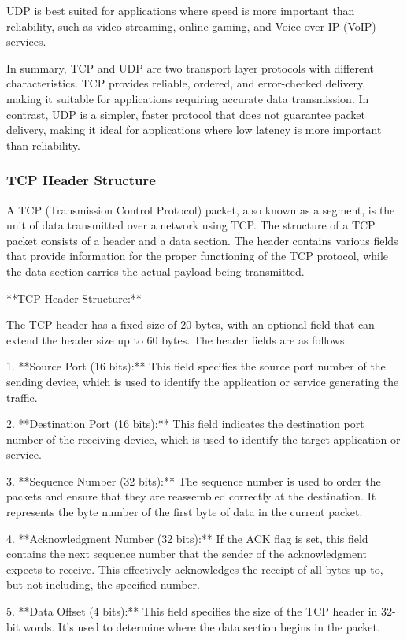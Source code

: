 \documentclass{article}
\begin{document}
UDP is best suited for applications where speed is more important than reliability, such as video streaming, online gaming, and Voice over IP (VoIP) services.

In summary, TCP and UDP are two transport layer protocols with different characteristics. TCP provides reliable, ordered, and error-checked delivery, making it suitable for applications requiring accurate data transmission. In contrast, UDP is a simpler, faster protocol that does not guarantee packet delivery, making it ideal for applications where low latency is more important than reliability.


\subsubsection{TCP Header Structure}

A TCP (Transmission Control Protocol) packet, also known as a segment, is the unit of data transmitted over a network using TCP. The structure of a TCP packet consists of a header and a data section. The header contains various fields that provide information for the proper functioning of the TCP protocol, while the data section carries the actual payload being transmitted.

**TCP Header Structure:**

The TCP header has a fixed size of 20 bytes, with an optional field that can extend the header size up to 60 bytes. The header fields are as follows:

1. **Source Port (16 bits):** This field specifies the source port number of the sending device, which is used to identify the application or service generating the traffic.

2. **Destination Port (16 bits):** This field indicates the destination port number of the receiving device, which is used to identify the target application or service.

3. **Sequence Number (32 bits):** The sequence number is used to order the packets and ensure that they are reassembled correctly at the destination. It represents the byte number of the first byte of data in the current packet.

4. **Acknowledgment Number (32 bits):** If the ACK flag is set, this field contains the next sequence number that the sender of the acknowledgment expects to receive. This effectively acknowledges the receipt of all bytes up to, but not including, the specified number.

5. **Data Offset (4 bits):** This field specifies the size of the TCP header in 32-bit words. It's used to determine where the data section begins in the packet.
\end{document}
